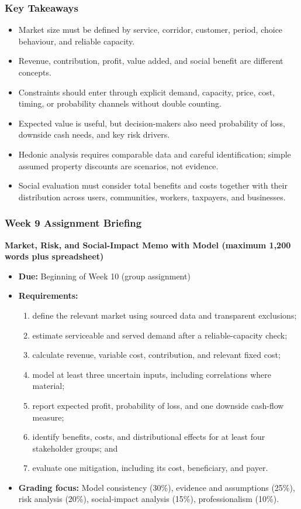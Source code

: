 \documentclass{beamer}
\begin{document}
\begin{frame}[t]
\frametitle{Key Takeaways}
\begin{itemize}
\item Market size must be defined by service, corridor, customer, period, choice behaviour, and reliable capacity.
\item Revenue, contribution, profit, value added, and social benefit are different concepts.
\item Constraints should enter through explicit demand, capacity, price, cost, timing, or probability channels without double counting.
\item Expected value is useful, but decision-makers also need probability of loss, downside cash needs, and key risk drivers.
\item Hedonic analysis requires comparable data and careful identification; simple assumed property discounts are scenarios, not evidence.
\item Social evaluation must consider total benefits and costs together with their distribution across users, communities, workers, taxpayers, and businesses.
\end{itemize}
\end{frame}

\begin{frame}[t]
\frametitle{Week 9 Assignment Briefing}
\textbf{Market, Risk, and Social-Impact Memo with Model (maximum 1,200 words plus spreadsheet)}
\begin{itemize}
\item \textbf{Due:} Beginning of Week 10 (group assignment)
\item \textbf{Requirements:}
\begin{enumerate}
\item define the relevant market using sourced data and transparent exclusions;
\item estimate serviceable and served demand after a reliable-capacity check;
\item calculate revenue, variable cost, contribution, and relevant fixed cost;
\item model at least three uncertain inputs, including correlations where material;
\item report expected profit, probability of loss, and one downside cash-flow measure;
\item identify benefits, costs, and distributional effects for at least four stakeholder groups; and
\item evaluate one mitigation, including its cost, beneficiary, and payer.
\end{enumerate}
\item \textbf{Grading focus:} Model consistency (30\%), evidence and assumptions (25\%), risk analysis (20\%), social-impact analysis (15\%), professionalism (10\%).
\end{itemize}
\end{frame}
\end{document}
